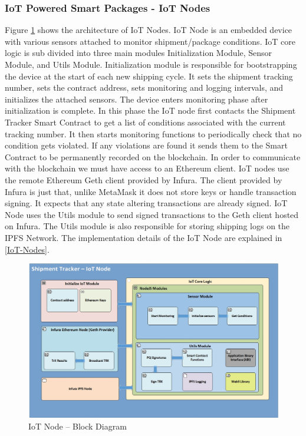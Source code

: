 \subsubsection{IoT Powered Smart Packages - IoT Nodes} \label{IoTNode} 
Figure \ref{fig:ArchitectureIoT} shows the architecture of IoT Nodes.  IoT Node is an embedded device with various sensors attached to monitor shipment/package conditions. IoT core logic is sub divided into three main modules Initialization Module, Sensor Module, and Utils Module. Initialization module is responsible for bootstrapping the device at the start of each new shipping cycle. It sets the shipment tracking number, sets the contract address, sets monitoring and logging intervals, and initializes the attached sensors. The device enters monitoring phase after initialization is complete. In this phase the IoT node first contacts the Shipment Tracker Smart Contract to get a list of conditions associated with the current tracking number. It then starts monitoring functions to periodically check that no condition gets violated. If any violations are found it sends them to the Smart Contract to be permanently recorded on the blockchain. In order to communicate with the blockchain we must have access to an Ethereum client. IoT nodes use the remote Ethereum Geth client provided by Infura. The client provided by Infura is just that, unlike MetaMask it does not store keys or handle transaction signing. It expects that any state altering transactions are already signed. IoT Node uses the Utils module to send signed transactions to the Geth client hosted on Infura. The Utils module is also responsible for storing shipping logs on the IPFS Network.  The implementation details of the IoT Node are explained in \ref{IoT-Nodes}.

\begin{figure}[h]
	\centering
    \includegraphics[width=170mm,scale=1]{figs/IoTNode-BD}
	\caption{IoT Node – Block Diagram}
	\label{fig:ArchitectureIoT} 
\end{figure}
\clearpage

